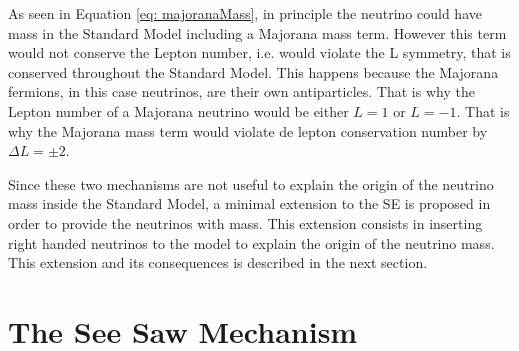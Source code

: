 As seen in Equation \ref{eq: majoranaMass}, in principle the neutrino could have mass in the Standard Model including a Majorana mass term. However this term would not conserve the Lepton number, i.e. would violate the L symmetry, that is conserved throughout the Standard Model. This happens because the Majorana fermions, in this case neutrinos, are their own antiparticles. That is why the Lepton number of a Majorana neutrino would be either $L = 1$ or $L = -1$. That is why the Majorana mass term would violate de lepton conservation number by $\Delta L = \pm 2$.

Since these two mechanisms are not useful to explain the origin of the neutrino mass inside the Standard Model, a minimal extension to the SE is proposed in order to provide the neutrinos with mass. This extension consists in inserting right handed neutrinos to the model to explain the origin of the neutrino mass. This extension and its consequences is described in the next section.

\section{The See Saw Mechanism} 



 


